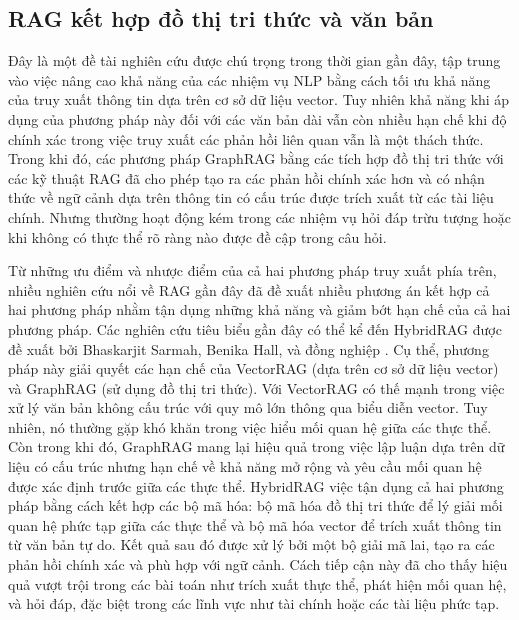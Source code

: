 \subsection{RAG kết hợp đồ thị tri thức và văn bản}
\label{subsection:graph_text_rag}
Đây là một đề tài nghiên cứu được chú trọng trong thời gian gần đây, tập trung vào việc nâng cao khả năng của các nhiệm vụ NLP bằng cách tối ưu khả năng của truy xuất thông tin dựa trên cơ sở dữ liệu vector. Tuy nhiên khả năng khi áp dụng của phương pháp này đối với các văn bản dài vẫn còn nhiều hạn chế khi độ chính xác trong việc truy xuất các phản hồi liên quan vẫn là một thách thức. Trong khi đó, các phương pháp GraphRAG bằng các tích hợp đồ thị tri thức với các kỹ thuật RAG đã cho phép tạo ra các phản hồi chính xác hơn và có nhận thức về ngữ cảnh dựa trên thông tin có cấu trúc được trích xuất từ các tài liệu chính. Nhưng thường hoạt động kém trong các nhiệm vụ hỏi đáp trừu tượng hoặc khi không có thực thể rõ ràng nào được đề cập trong câu hỏi.

Từ những ưu điểm và nhược điểm của cả hai phương pháp truy xuất phía trên, nhiều nghiên cứu nổi về RAG gần đây đã đề xuất nhiều phương án kết hợp cả hai phương pháp nhằm tận dụng những khả năng và giảm bớt hạn chế của cả hai phương pháp. Các nghiên cứu tiêu biểu gần đây có thể kể đến HybridRAG được đề xuất bởi Bhaskarjit Sarmah, Benika Hall, và đồng nghiệp \cite{HybridRAG2024}. Cụ thể, phương pháp này giải quyết các hạn chế của VectorRAG (dựa trên cơ sở dữ liệu vector) và GraphRAG (sử dụng đồ thị tri thức). Với VectorRAG có thế mạnh trong việc xử lý văn bản không cấu trúc với quy mô lớn thông qua biểu diễn vector. Tuy nhiên, nó thường gặp khó khăn trong việc hiểu mối quan hệ giữa các thực thể. Còn trong khi đó, GraphRAG mang lại hiệu quả trong việc lập luận dựa trên dữ liệu có cấu trúc nhưng hạn chế về khả năng mở rộng và yêu cầu mối quan hệ được xác định trước giữa các thực thể.
HybridRAG việc tận dụng cả hai phương pháp bằng cách kết hợp các bộ mã hóa: bộ mã hóa đồ thị tri thức để lý giải mối quan hệ phức tạp giữa các thực thể và bộ mã hóa vector để trích xuất thông tin từ văn bản tự do. Kết quả sau đó được xử lý bởi một bộ giải mã lai, tạo ra các phản hồi chính xác và phù hợp với ngữ cảnh. Cách tiếp cận này đã cho thấy hiệu quả vượt trội trong các bài toán như trích xuất thực thể, phát hiện mối quan hệ, và hỏi đáp, đặc biệt trong các lĩnh vực như tài chính hoặc các tài liệu phức tạp.

